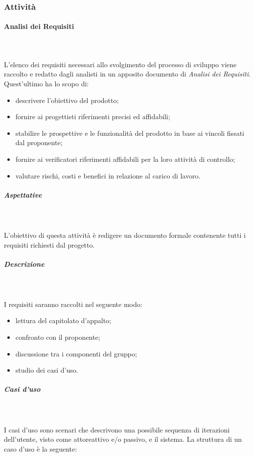 		\subsubsection{Attività}
			\paragraph{Analisi dei Requisiti} \mbox{} \\ \mbox{} \\
			L'elenco dei requisiti necessari allo svolgimento del processo di sviluppo viene raccolto e redatto dagli analisti in un apposito documento di \textit{Analisi dei Requisiti}. Quest'ultimo ha lo scopo di:
				\begin{itemize}
					\item descrivere l'obiettivo del prodotto;
					\item fornire ai progettisti riferimenti precisi ed affidabili;
					\item stabilire le prospettive e le funzionalità del prodotto in base ai vincoli fissati dal proponente;
					\item fornire ai verificatori riferimenti affidabili per la loro attività di controllo;
					\item valutare rischi, costi e benefici in relazione al carico di lavoro.
				\end{itemize} 
			\subparagraph{Aspettative} \mbox{} \\ \mbox{} \\
			L'obiettivo di questa attività è redigere un documento formale contenente tutti i requisiti richiesti dal progetto.
			\subparagraph{Descrizione} \mbox{} \\ \mbox{} \\
			I requisiti saranno raccolti nel seguente modo:
				\begin{itemize} 
					\item lettura del capitolato d'appalto;
					\item confronto con il proponente;
					\item discussione tra i componenti del gruppo;
					\item studio dei casi d'uso.
				\end{itemize}
				\subparagraph{Casi d'uso} \mbox{} \\ \mbox{} \\
				I casi d'uso sono scenari che descrivono una possibile sequenza di iterazioni dell'utente, visto come attore\glo attivo e/o passivo, e il sistema. La struttura di un caso d'uso è la seguente:
